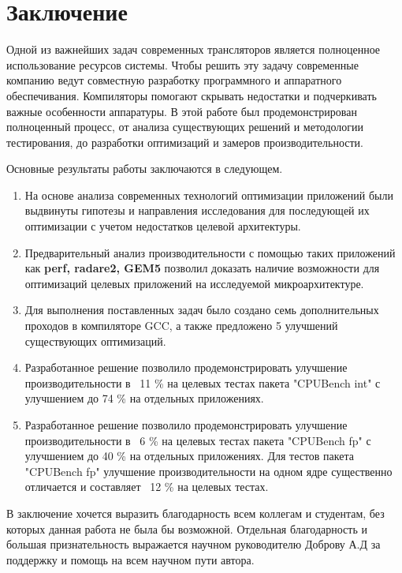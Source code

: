 \chapter*{Заключение}                       %

Одной из важнейших задач современных трансляторов является полноценное использование ресурсов системы. Чтобы решить эту задачу современные компанию ведут совместную разработку программного и аппаратного обеспечивания. Компиляторы помогают скрывать недостатки и подчеркивать важные особенности аппаратуры. В этой работе был продемонстрирован полноценный процесс, от анализа существующих решений и методологии тестирования, до разработки оптимизаций и замеров производительности. 

Основные результаты работы заключаются в следующем.
\begin{enumerate}
	\item На основе анализа современных технологий оптимизации приложений были выдвинуты гипотезы и направления исследования для последующей их оптимизации с учетом недостатков целевой архитектуры.
	\item Предварительный анализ производительности с помощью таких приложений как \textbf{perf, radare2, GEM5} позволил доказать наличие возможности  для оптимизаций целевых приложений на исследуемой микроархитектуре. 
	\item Для выполнения поставленных задач было создано семь дополнительных проходов в компиляторе GCC, а также предложено 5 улучшений существующих оптимизаций.
	\item Разработанное решение позволило продемонстрировать улучшение производительности в ~11 \% на целевых тестах пакета "CPUBench int"\phantom{}  с улучшением до 74 \% на отдельных приложениях. 
	\item Разработанное решение позволило продемонстрировать улучшение производительности в ~6 \% на целевых тестах пакета "CPUBench fp"\phantom{}  с улучшением до 40 \% на отдельных приложениях. Для тестов пакета "CPUBench fp"\phantom{} улучшение производительности на  одном ядре существенно отличается и составляет ~12 \% на целевых тестах.
\end{enumerate}

В заключение хочется выразить благодарность всем коллегам и студентам, без которых данная работа не была бы возможной. Отдельная благодарность и большая признательность выражается научном руководителю Доброву А.Д за поддержку и помощь на всем научном пути автора.
